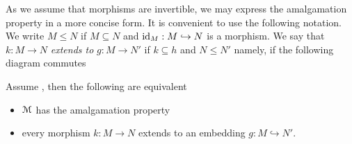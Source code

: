 \hfil{}

As we assume that morphisms are invertible, we may express the amalgamation property in a more concise form.
It is convenient to use the following notation.
We write \emph{$M\le N$\/} if $M\subseteq N$ and ${\rm id}_M:M\hookrightarrow N$ is a morphism.
We say that $k:M\to N$ \emph{extends to\/} $g:M\to N'$ if $k\subseteq h$ and  $N\le N'$ namely, if the following diagram commutes

\hfil{}

\begin{proposition}\label{prop_amalgamation_def}
Assume , then the following are equivalent
\begin{itemize}
\item[1.] $\EuScript M$ has the amalgamation property
\item[2.] every morphism $k:M\to N$ extends to an embedding $g : M\hookrightarrow N'$.
\end{itemize}
\end{proposition}

